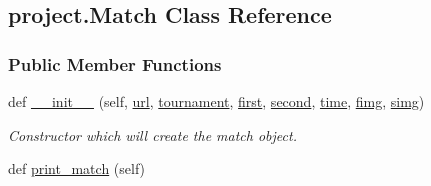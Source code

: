\hypertarget{classproject_1_1Match}{}\subsection{project.\+Match Class Reference}
\label{classproject_1_1Match}
\subsubsection*{Public Member Functions}
\begin{DoxyCompactItemize}
\item 
def \hyperlink{classproject_1_1Match_ad2fa413ba7c2d3aee59ab1996aa8ceeb}{\+\_\+\+\_\+init\+\_\+\+\_\+} (self, \hyperlink{classproject_1_1Match_aeac700e0377708bc3d768f572544ab5e}{url}, \hyperlink{classproject_1_1Match_ac377f100bd078655a754762297731e8a}{tournament}, \hyperlink{classproject_1_1Match_ae8c662a467c74a3b376cbddf4124a84c}{first}, \hyperlink{classproject_1_1Match_a4fcd044cc75f74987b145b1ea24b917c}{second}, \hyperlink{classproject_1_1Match_ae51416730a405b3cad5df20a3e58cbdb}{time}, \hyperlink{classproject_1_1Match_a76c2df132c697094719f0d7450994811}{fimg}, \hyperlink{classproject_1_1Match_acca1adecce8205e38cc55c43b70b2867}{simg})
\begin{DoxyCompactList}\small\item\em Constructor which will create the match object. \end{DoxyCompactList}\item 
def \hyperlink{classproject_1_1Match_a11afa1845b3275633f1dbe75f66e5a7c}{print\+\_\+match} (self)
\end{DoxyCompactItemize}
